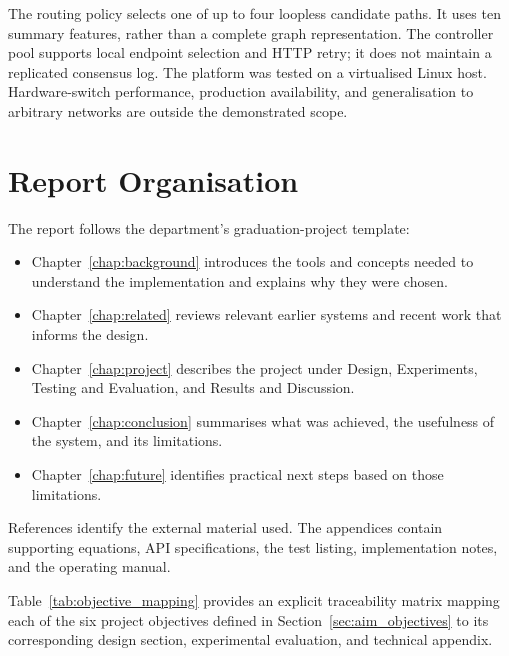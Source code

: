 \documentclass[12pt,a4paper,oneside]{report}
\begin{document}
The routing policy selects one of up to four loopless candidate paths. It uses ten summary features, rather than a complete graph representation. The controller pool supports local endpoint selection and HTTP retry; it does not maintain a replicated consensus log. The platform was tested on a virtualised Linux host. Hardware-switch performance, production availability, and generalisation to arbitrary networks are outside the demonstrated scope.

\section{Report Organisation}
The report follows the department's graduation-project template:
\begin{itemize}
    \item Chapter~\ref{chap:background} introduces the tools and concepts needed to understand the implementation and explains why they were chosen.
    \item Chapter~\ref{chap:related} reviews relevant earlier systems and recent work that informs the design.
    \item Chapter~\ref{chap:project} describes the project under Design, Experiments, Testing and Evaluation, and Results and Discussion.
    \item Chapter~\ref{chap:conclusion} summarises what was achieved, the usefulness of the system, and its limitations.
    \item Chapter~\ref{chap:future} identifies practical next steps based on those limitations.
\end{itemize}
References identify the external material used. The appendices contain supporting equations, API specifications, the test listing, implementation notes, and the operating manual.

Table~\ref{tab:objective_mapping} provides an explicit traceability matrix mapping each of the six project objectives defined in Section~\ref{sec:aim_objectives} to its corresponding design section, experimental evaluation, and technical appendix.
\end{document}

